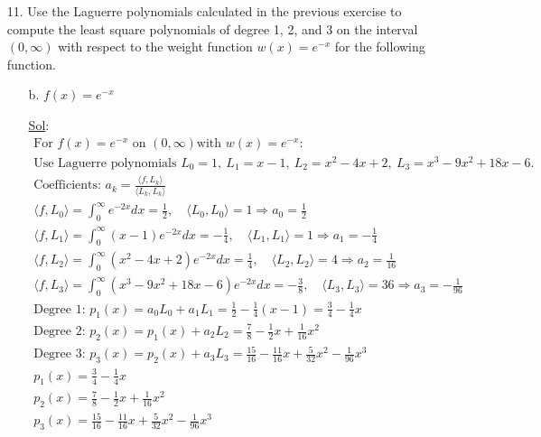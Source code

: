 \begin{enumerate}
  \item[11.] Use the Laguerre polynomials calculated in the previous
    exercise to compute the least square polynomials of degree 1, 2,
    and 3 on the interval \((0, \infty)\) with respect to the weight
    function \(w(x) = e^{-x}\) for the following function.
    \begin{enumerate}
      \item[b.] \(f(x) = e^{-x}\)

        \underline{Sol}:\\

        \[
          \begin{array}{l}
            \text{For } f(x) = e^{-x} \text{ on } (0, \infty) \text{
            with } w(x) = e^{-x}: \\
            \text{Use Laguerre polynomials }
            L_0=1,\ L_1=x-1,\ L_2=x^2-4x+2,\ L_3=x^3-9x^2+18x-6. \\
            \text{Coefficients: } a_k = \frac{\langle f, L_k
            \rangle}{\langle L_k, L_k \rangle} \\
            \langle f, L_0 \rangle = \int_0^\infty e^{-2x}dx =
            \frac{1}{2}, \quad \langle L_0, L_0 \rangle = 1
            \Rightarrow a_0 = \frac{1}{2} \\
            \langle f, L_1 \rangle = \int_0^\infty (x-1)e^{-2x}dx =
            -\frac{1}{4}, \quad \langle L_1, L_1 \rangle = 1
            \Rightarrow a_1 = -\frac{1}{4} \\
            \langle f, L_2 \rangle = \int_0^\infty
            (x^2-4x+2)e^{-2x}dx = \frac{1}{4}, \quad \langle L_2, L_2
            \rangle = 4 \Rightarrow a_2 = \frac{1}{16} \\
            \langle f, L_3 \rangle = \int_0^\infty
            (x^3-9x^2+18x-6)e^{-2x}dx = -\frac{3}{8}, \quad \langle
            L_3, L_3 \rangle = 36 \Rightarrow a_3 = -\frac{1}{96} \\
            \text{Degree 1: } p_1(x) = a_0L_0 + a_1L_1 = \frac{1}{2}
            - \frac{1}{4}(x-1) = \frac{3}{4} - \frac{1}{4}x \\
            \text{Degree 2: } p_2(x) = p_1(x) + a_2L_2 = \frac{7}{8}
            - \frac{1}{2}x + \frac{1}{16}x^2 \\
            \text{Degree 3: } p_3(x) = p_2(x) + a_3L_3 =
            \frac{15}{16} - \frac{11}{16}x + \frac{5}{32}x^2 -
            \frac{1}{96}x^3 \\
            \boxed{p_1(x) = \frac{3}{4} - \frac{1}{4}x} \\
            \boxed{p_2(x) = \frac{7}{8} - \frac{1}{2}x + \frac{1}{16}x^2} \\
            \boxed{p_3(x) = \frac{15}{16} - \frac{11}{16}x +
            \frac{5}{32}x^2 - \frac{1}{96}x^3}
          \end{array}
        \]
    \end{enumerate}
\end{enumerate}
